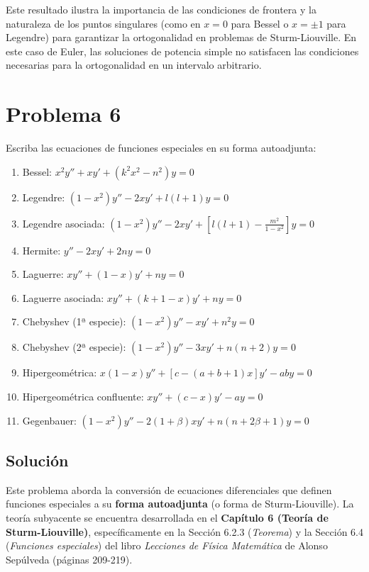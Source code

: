 \documentclass[a4paper]{article}
\begin{document}
Este resultado ilustra la importancia de las condiciones de frontera y la naturaleza de los puntos singulares (como en $x=0$ para Bessel o $x=\pm 1$ para Legendre) para garantizar la ortogonalidad en problemas de Sturm-Liouville. En este caso de Euler, las soluciones de potencia simple no satisfacen las condiciones necesarias para la ortogonalidad en un intervalo arbitrario.


\section{Problema 6}
Escriba las ecuaciones de funciones especiales en su forma autoadjunta:
\begin{enumerate}
    \item[(a)] Bessel: $x^2 y'' + xy' + (k^2 x^2 - n^2)y = 0$
    \item[(b)] Legendre: $(1 - x^2)y'' - 2xy' + l(l+1)y = 0$
    \item[(c)] Legendre asociada: $(1 - x^2)y'' - 2xy' + [l(l+1) - \frac{m^2}{1-x^2}]y = 0$
    \item[(d)] Hermite: $y'' - 2xy' + 2ny = 0$
    \item[(e)] Laguerre: $xy'' + (1 - x)y' + ny = 0$
    \item[(f)] Laguerre asociada: $xy'' + (k+1 - x)y' + ny = 0$
    \item[(g)] Chebyshev (1ª especie): $(1 - x^2)y'' - xy' + n^2y = 0$
    \item[(h)] Chebyshev (2ª especie): $(1 - x^2)y'' - 3xy' + n(n+2)y = 0$
    \item[(i)] Hipergeométrica: $x(1 - x)y'' + [c - (a+b+1)x]y' - aby = 0$
    \item[(j)] Hipergeométrica confluente: $xy'' + (c - x)y' - ay = 0$
    \item[(k)] Gegenbauer: $(1 - x^2)y'' - 2(1+\beta)xy' + n(n+2\beta+1)y = 0$
\end{enumerate}

\subsection{Solución}

Este problema aborda la conversión de ecuaciones diferenciales que definen funciones especiales a su \textbf{forma autoadjunta} (o forma de Sturm-Liouville). La teoría subyacente se encuentra desarrollada en el \textbf{Capítulo 6 (Teoría de Sturm-Liouville)}, específicamente en la Sección 6.2.3 (\textit{Teorema}) y la Sección 6.4 (\textit{Funciones especiales}) del libro \textit{Lecciones de Física Matemática} de Alonso Sepúlveda (páginas 209-219).
\end{document}
